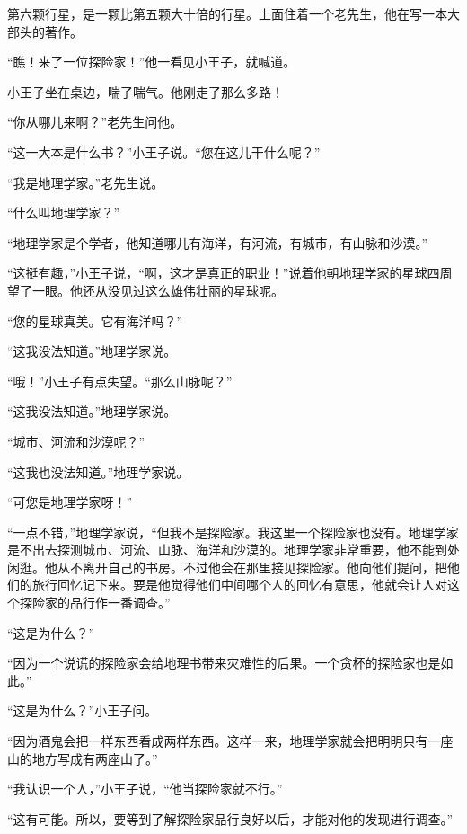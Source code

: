 
\stoptitle

\starttitle[title={15},reference={part0017.html_a018}]

第六颗行星，是一颗比第五颗大十倍的行星。上面住着一个老先生，他在写一本大部头的著作。

“瞧！来了一位探险家！”他一看见小王子，就喊道。

小王子坐在桌边，喘了喘气。他刚走了那么多路！

“你从哪儿来啊？”老先生问他。

“这一大本是什么书？”小王子说。“您在这儿干什么呢？”

“我是地理学家。”老先生说。

“什么叫地理学家？”

“地理学家是个学者，他知道哪儿有海洋，有河流，有城市，有山脉和沙漠。”

“这挺有趣，”小王子说，“啊，这才是真正的职业！”说着他朝地理学家的星球四周望了一眼。他还从没见过这么雄伟壮丽的星球呢。

{\startalignment[center]
 \stopalignment}

“您的星球真美。它有海洋吗？”

“这我没法知道。”地理学家说。

“哦！”小王子有点失望。“那么山脉呢？”

“这我没法知道。”地理学家说。

“城市、河流和沙漠呢？”

“这我也没法知道。”地理学家说。

“可您是地理学家呀！”

“一点不错，”地理学家说，“但我不是探险家。我这里一个探险家也没有。地理学家是不出去探测城市、河流、山脉、海洋和沙漠的。地理学家非常重要，他不能到处闲逛。他从不离开自己的书房。不过他会在那里接见探险家。他向他们提问，把他们的旅行回忆记下来。要是他觉得他们中间哪个人的回忆有意思，他就会让人对这个探险家的品行作一番调查。”

“这是为什么？”

“因为一个说谎的探险家会给地理书带来灾难性的后果。一个贪杯的探险家也是如此。”

“这是为什么？”小王子问。

“因为酒鬼会把一样东西看成两样东西。这样一来，地理学家就会把明明只有一座山的地方写成有两座山了。”

“我认识一个人，”小王子说，“他当探险家就不行。”

“这有可能。所以，要等到了解探险家品行良好以后，才能对他的发现进行调查。”

